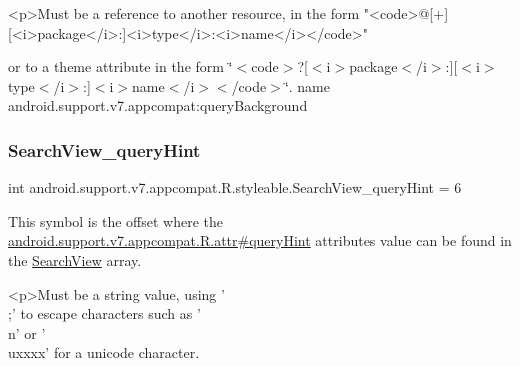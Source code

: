 \begin{DoxyVerb}      <p>Must be a reference to another resource, in the form "<code>@[+][<i>package</i>:]<i>type</i>:<i>name</i></code>"
\end{DoxyVerb}
 or to a theme attribute in the form \char`\"{}$<$code$>$?\mbox{[}$<$i$>$package$<$/i$>$\+:\mbox{]}\mbox{[}$<$i$>$type$<$/i$>$\+:\mbox{]}$<$i$>$name$<$/i$>$$<$/code$>$\char`\"{}.  name android.\+support.\+v7.\+appcompat\+:query\+Background \mbox{\label{classandroid_1_1support_1_1v7_1_1appcompat_1_1R_1_1styleable_a90f513ff603af9e55eadeff9c70fbbfb}} 
\subsubsection{\texorpdfstring{Search\+View\+\_\+query\+Hint}{SearchView\_queryHint}}
{\footnotesize\ttfamily int android.\+support.\+v7.\+appcompat.\+R.\+styleable.\+Search\+View\+\_\+query\+Hint = 6\hspace{0.3cm}{\ttfamily [static]}}

This symbol is the offset where the \hyperlink{classandroid_1_1support_1_1v7_1_1appcompat_1_1R_1_1attr_a8b9b50a850d6c45d35817e80f50f33f4}{android.\+support.\+v7.\+appcompat.\+R.\+attr\#query\+Hint} attribute\textquotesingle{}s value can be found in the \hyperlink{classandroid_1_1support_1_1v7_1_1appcompat_1_1R_1_1styleable_a01af09df9e38f1e4f57165c3d3cee9fe}{Search\+View} array.

\begin{DoxyVerb}      <p>Must be a string value, using '\\;' to escape characters such as '\\n' or '\\uxxxx' for a unicode character.
\end{DoxyVerb}
 

